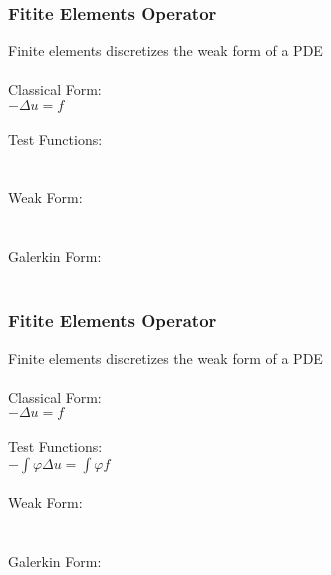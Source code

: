 \documentclass{beamer}
\begin{document}
\begin{frame}
\begin{center}
\frametitle{Fitite Elements Operator}

Finite elements discretizes the weak form of a PDE\\

~\\

Classical Form:\\
$- \Delta u = f$\\

~\\

Test Functions:\\
~\\

~\\

Weak Form:\\
~\\

~\\

Galerkin Form:\\
~

\end{center}
\end{frame}


\begin{frame}
\begin{center}
\frametitle{Fitite Elements Operator}

Finite elements discretizes the weak form of a PDE\\

~\\

Classical Form:\\
$- \Delta u = f$\\

~\\

Test Functions:\\
$- \int \varphi \Delta u = \int \varphi f$\\

~\\

Weak Form:\\
~\\

~\\

Galerkin Form:\\
~

\end{center}
\end{frame}
\end{document}

